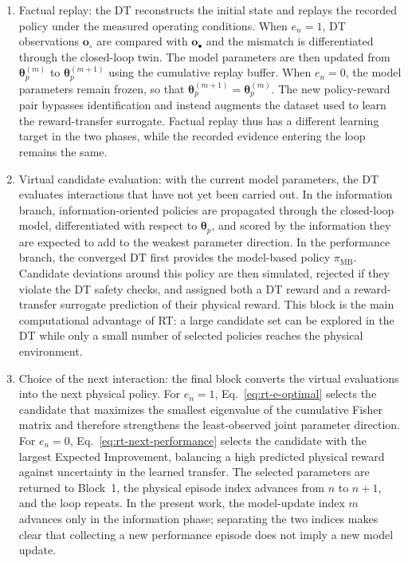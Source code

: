\documentclass[journal]{IEEEtran}
\begin{document}
\begin{enumerate}
    \item Factual replay: the DT reconstructs the initial state and replays the recorded policy under the measured operating conditions. When $e_n=1$, DT observations $\mathbf o_{\circ}$ are compared with $\mathbf o_{\bullet}$ and the mismatch is differentiated through the closed-loop twin. The model parameters are then updated from $\boldsymbol{\theta}_p^{(m)}$ to $\boldsymbol{\theta}_p^{(m+1)}$ using the cumulative replay buffer. When $e_n=0$, the model parameters remain frozen, so that $\boldsymbol{\theta}_p^{(m+1)}=\boldsymbol{\theta}_p^{(m)}$. The new policy-reward pair bypasses identification and instead augments the dataset used to learn the reward-transfer surrogate. Factual replay thus has a different learning target in the two phases, while the recorded evidence entering the loop remains the same.
    \item Virtual candidate evaluation: with the current model parameters, the DT evaluates interactions that have not yet been carried out. In the information branch, information-oriented policies are propagated through the closed-loop model, differentiated with respect to $\boldsymbol{\theta}_p$, and scored by the information they are expected to add to the weakest parameter direction. In the performance branch, the converged DT first provides the model-based policy $\pi_{\mathrm{MB}}$. Candidate deviations around this policy are then simulated, rejected if they violate the DT safety checks, and assigned both a DT reward and a reward-transfer surrogate prediction of their physical reward. This block is the main computational advantage of RT: a large candidate set can be explored in the DT while only a small number of selected policies reaches the physical environment.
    \item Choice of the next interaction: the final block converts the virtual evaluations into the next physical policy. For $e_n=1$, Eq.~\eqref{eq:rt-e-optimal} selects the candidate that maximizes the smallest eigenvalue of the cumulative Fisher matrix and therefore strengthens the least-observed joint parameter direction. For $e_n=0$, Eq.~\eqref{eq:rt-next-performance} selects the candidate with the largest Expected Improvement, balancing a high predicted physical reward against uncertainty in the learned transfer. The selected parameters are returned to Block~1, the physical episode index advances from $n$ to $n+1$, and the loop repeats. In the present work, the model-update index $m$ advances only in the information phase; separating the two indices makes clear that collecting a new performance episode does not imply a new model update.
\end{enumerate}
\end{document}
